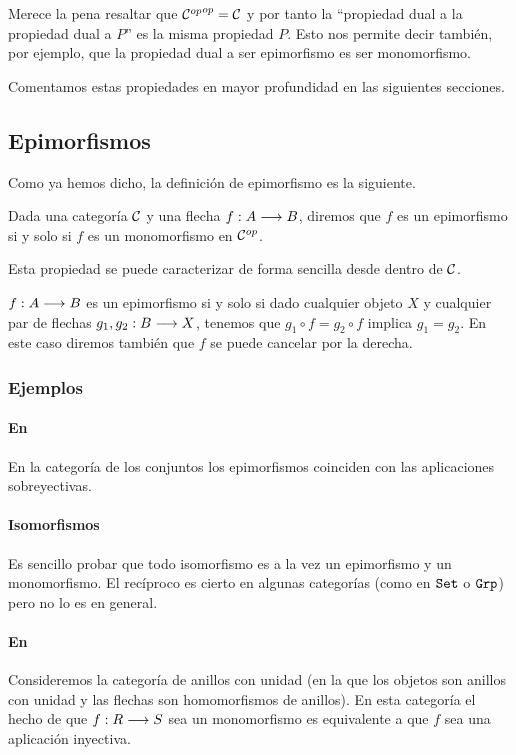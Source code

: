 Merece la pena resaltar que ${\mathcal{C}^{op}}^{op} = \mathcal{C}$ y por tanto
la ``propiedad dual a la propiedad dual a $P$'' es la misma propiedad
$P$. Esto nos permite decir también, por ejemplo, que la propiedad
dual a ser epimorfismo es ser monomorfismo.

Comentamos estas propiedades en mayor profundidad en las siguientes
secciones.

\subsection{Epimorfismos}
Como ya hemos dicho, la definición de epimorfismo es la siguiente.
\begin{definition}
Dada una categoría $\mathcal{C}$ y una flecha $f: A\longrightarrow B$, diremos que
$f$ es un epimorfismo si y solo si $f$ es un monomorfismo en
$\mathcal{C}^{op}$.
\end{definition}
Esta propiedad
se puede caracterizar de forma sencilla desde dentro de $\mathcal{C}$.
\begin{proposition}
$f: A\longrightarrow B$ es un epimorfismo si y solo si dado cualquier objeto $X$ y
cualquier par de flechas $g_1, g_2 : B\longrightarrow X$,
tenemos que $g_1 \circ f = g_2 \circ f$ implica $g_1 = g_2$.
En este caso diremos también que $f$ se puede cancelar por la
derecha.
\end{proposition}

\subsubsection{Ejemplos}
\paragraph{En \Set}
En la categoría de los conjuntos los epimorfismos coinciden con las
aplicaciones sobreyectivas.

\paragraph{Isomorfismos}
Es sencillo probar que todo isomorfismo es a la vez
un epimorfismo y un monomorfismo.
El recíproco
es cierto en algunas categorías (como en $\texttt{Set}$ o $\texttt{Grp}$) pero no
lo es en general.

\paragraph{En \Ring}
Consideremos la categoría de anillos con unidad (en la
que los objetos son anillos con unidad y
las flechas son homomorfismos de anillos). En esta categoría
el hecho de que $f : R\longrightarrow S$ sea un monomorfismo
es equivalente a que $f$ sea una aplicación
inyectiva.


